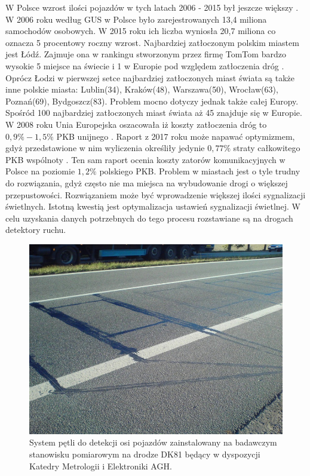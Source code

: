 \documentclass[12pt]{book}
\begin{document}
W Polsce wzrost ilości pojazdów w tych latach 2006 - 2015 był jeszcze większy \cite{liczbaPojazdowPolska}. W 2006 roku według GUS w Polsce było zarejestrowanych 13,4 miliona samochodów osobowych. W 2015 roku ich liczba wyniosła 20,7 miliona co oznacza 5 procentowy roczny wzrost.
Najbardziej zatłoczonym polskim miastem jest Łódź. Zajmuje ona w rankingu stworzonym przez firmę TomTom bardzo wysokie 5 miejsce na świecie i 1 w Europie pod względem zatłoczenia dróg \cite{rankingTomTom}. Oprócz Łodzi w pierwszej setce najbardziej zatłoczonych miast świata są także inne polskie miasta: Lublin(34), Kraków(48), Warszawa(50), Wrocław(63), Poznań(69), Bydgoszcz(83). Problem mocno dotyczy jednak także całej Europy. Spośród 100 najbardziej zatłoczonych miast świata aż 45 znajduje się w Europie. W 2008 roku Unia Europejska oszacowała iż koszty zatłoczenia dróg to $0,9\%-1,5\%$ PKB unijnego \cite{ue2008}. Raport z 2017 roku może napawać optymizmem, gdyż przedstawione w nim wyliczenia określiły jedynie $0,77\%$ straty całkowitego PKB wspólnoty \cite{ue2017}. Ten sam raport ocenia koszty zatorów komunikacyjnych w Polsce na poziomie $1,2\%$ polskiego PKB.
Problem w miastach jest o tyle trudny do rozwiązania, gdyż często nie ma miejsca na wybudowanie drogi o większej przepustowości. Rozwiązaniem może być wprowadzenie większej ilości sygnalizacji świetlnych. Istotną kwestią jest optymalizacja ustawień sygnalizacji świetlnej. W celu uzyskania danych potrzebnych do tego procesu rozstawiane są na drogach detektory ruchu. 
\begin{figure}[H]
  \centering
    \includegraphics[width=14cm]{Detektor}
 \caption{System pętli do detekcji osi pojazdów zainstalowany na badawczym stanowisku pomiarowym na drodze DK81 będący w dyspozycji Katedry Metrologii i Elektroniki AGH.}
 \label{fig:Detektor}
\end{figure} \noindent
%
\end{document}

